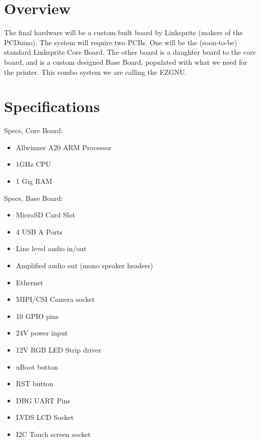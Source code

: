 %
%
%
%
%

\section{Overview}
The final hardware will be a custom built board by Linksprite (makers of the
PCDuino). The system will require two PCBs. One will be the (soon-to-be)
standard Linksprite Core Board. The other board is a daughter board to the
core board, and is a custom designed Base Board, populated with what we need
for the printer. This combo system we are calling the EZGNU.

\section{Specifications}
Specs, Core Board:

\begin{itemize}
  \item{Allwinner A20 ARM Processor}
  \item{1GHz CPU}
  \item{1 Gig RAM}
\end{itemize}

Specs, Base Board:
\begin{itemize}
  \item{MicroSD Card Slot}
  \item{4 USB A Ports}
  \item{Line level audio in/out}
  \item{Amplified audio out (mono speaker headers)}
  \item{Ethernet}
  \item{MIPI/CSI Camera socket}
  \item{10 GPIO pins}
  \item{24V power input}
  \item{12V RGB LED Strip driver}
  \item{uBoot button}
  \item{RST button}
  \item{DBG UART Pins}
  \item{LVDS LCD Socket}
  \item{I2C Touch screen socket}
\end{itemize}


